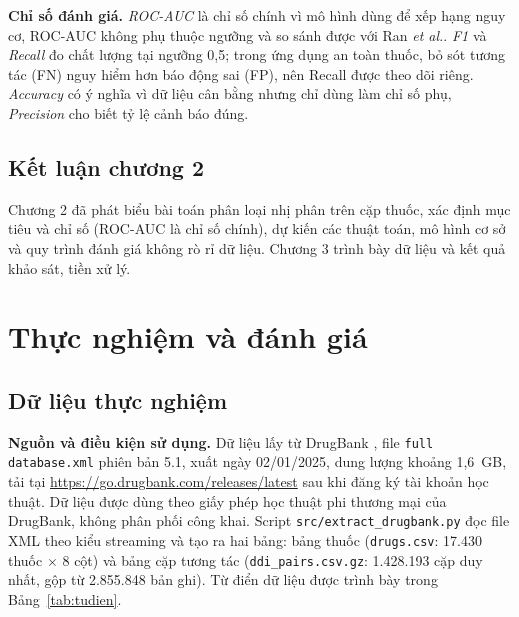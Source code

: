 \documentclass[12pt,a4paper,oneside]{report}
\begin{document}
\textbf{Chỉ số đánh giá.} \emph{ROC-AUC} là chỉ số chính vì mô hình dùng để xếp
hạng nguy cơ, ROC-AUC không phụ thuộc ngưỡng và so sánh được với Ran \textit{et
al.}. \emph{F1} và \emph{Recall} đo chất lượng tại ngưỡng 0,5; trong ứng dụng an
toàn thuốc, bỏ sót tương tác (FN) nguy hiểm hơn báo động sai (FP), nên Recall
được theo dõi riêng. \emph{Accuracy} có ý nghĩa vì dữ liệu cân bằng nhưng chỉ
dùng làm chỉ số phụ, \emph{Precision} cho biết tỷ lệ cảnh báo đúng.

\section{Kết luận chương 2}
Chương 2 đã phát biểu bài toán phân loại nhị phân trên cặp thuốc, xác định mục
tiêu và chỉ số (ROC-AUC là chỉ số chính), dự kiến các thuật toán, mô hình cơ sở
và quy trình đánh giá không rò rỉ dữ liệu. Chương 3 trình bày dữ liệu và kết
quả khảo sát, tiền xử lý.

\chapter{Thực nghiệm và đánh giá}
\label{chap:thucnghiem}

\section{Dữ liệu thực nghiệm}
\textbf{Nguồn và điều kiện sử dụng.} Dữ liệu lấy từ DrugBank \cite{wishart2018},
file \texttt{full database.xml} phiên bản 5.1, xuất ngày 02/01/2025, dung lượng
khoảng 1,6~GB, tải tại \url{https://go.drugbank.com/releases/latest} sau khi đăng
ký tài khoản học thuật. Dữ liệu được dùng theo giấy phép học thuật phi thương mại
của DrugBank, không phân phối công khai. Script \texttt{src/extract\_drugbank.py}
đọc file XML theo kiểu streaming và tạo ra hai bảng: bảng thuốc
(\texttt{drugs.csv}: 17.430 thuốc $\times$ 8 cột) và bảng cặp tương tác
(\texttt{ddi\_pairs.csv.gz}: 1.428.193 cặp duy nhất, gộp từ 2.855.848 bản ghi).
Từ điển dữ liệu được trình bày trong Bảng~\ref{tab:tudien}.
\end{document}
